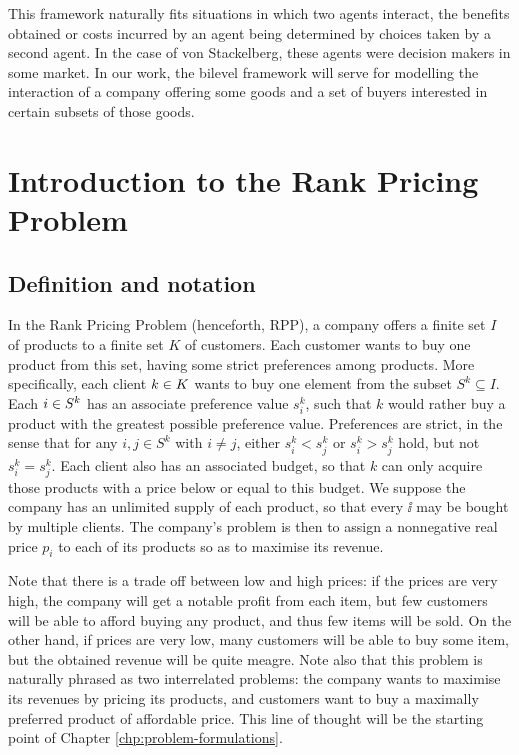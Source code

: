 This framework naturally fits situations in which two agents interact, the
benefits obtained or costs incurred by an agent being determined by choices
taken by a second agent. In the case of von Stackelberg, these agents were
decision makers in some market. In our work, the bilevel framework will serve
for modelling the interaction of a company offering some goods and a set of
buyers interested in certain subsets of those goods.

\section{Introduction to the Rank Pricing Problem} %
\label{sec:int:rpp}

\subsection{Definition and notation}

In the Rank Pricing Problem (henceforth, RPP), a company offers a finite set $I$
of products to a finite set $K$ of customers. Each customer wants to buy one
product from this set, having some strict preferences among products. More
specifically, each client ${k \in K}$ wants to buy one element from the subset $S^k
\subseteq I$. Each ${i \in S^k}$ has an associate preference value $s_i^k$, such that
$k$ would rather buy a product with the greatest possible preference value.
Preferences are strict, in the sense that for any $i, j \in S^k$ with $i \neq
j$, either $s_i^k < s_j^k$ or $s_i^k > s_j^k$ hold, but not $s_i^k = s_j^k$.
Each client also has an associated budget, so that $k$ can only acquire those
products with a price below or equal to this budget. We suppose the company has
an unlimited supply of each product, so that every $\ii$ may be bought by
multiple clients. The company's problem is then to assign a nonnegative real
price $p_i$ to each of its products so as to maximise its revenue.

Note that there is a trade off between low and high prices: if the prices are
very high, the company will get a notable profit from each item, but few
customers will be able to afford buying any product, and thus few items will be
sold. On the other hand, if prices are very low, many customers will be able to
buy some item, but the obtained revenue will be quite meagre. Note also that
this problem is naturally phrased as two interrelated problems: the company
wants to maximise its revenues by pricing its products, and customers want to
buy a maximally preferred product of affordable price. This line of thought
will be the starting point of Chapter \ref{chp:problem-formulations}.

